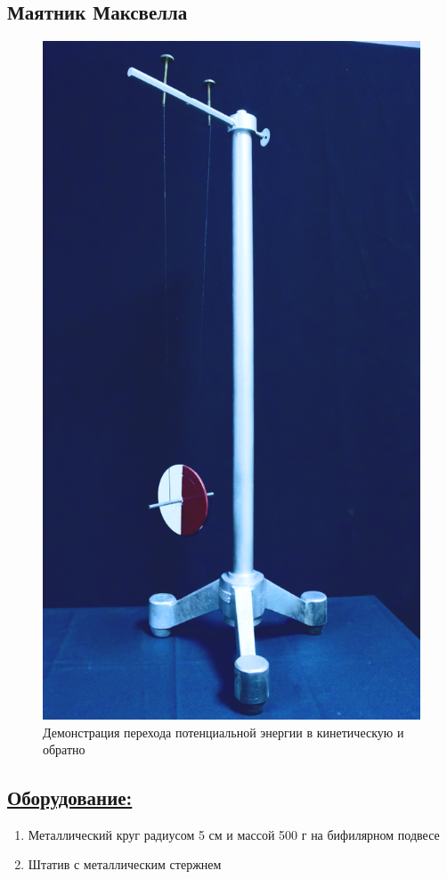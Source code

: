 \documentclass[14pt,a4paper,oneside]{extarticle}	%
\begin{document}
	
	
	\newpage
	\begin{center}
		\subsection*{Маятник Максвелла}
	\end{center}

\begin{figure}[H] 	
	\centering 	
	\includegraphics[width=0.5\linewidth]{Maxwell-1.png}
	\caption{Демонстрация перехода потенциальной энергии в кинетическую и обратно}
	\label{Maxwell-1}
\end{figure}

\subsection*{\underline{Оборудование:}}
\begin{enumerate}
	\item Металлический круг радиусом 5 см и массой 500 г на бифилярном подвесе
	\item Штатив с металлическим стержнем
\end{enumerate}
	
\end{document}
